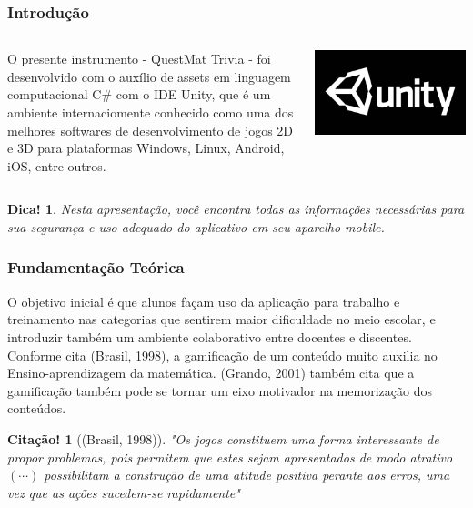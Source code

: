\documentclass[10pt]{beamer}
\newtheorem{hint}[theorem]{Dica!}
\newtheorem{refboi}[theorem]{Citação!}
\begin{document}
\begin{frame}
\frametitle{Introdução}
\begin{columns}

O presente instrumento - QuestMat Trivia - foi desenvolvido com o auxílio de assets em linguagem computacional C\# com o IDE Unity, que é um ambiente internaciomente conhecido como uma dos melhores softwares de desenvolvimento de jogos 2D e 3D para plataformas Windows, Linux, Android, iOS, entre outros.

	
	\includegraphics[width=\linewidth]{unity.jpg}
\end{columns}

\vspace{1cm}
\begin{hint}
Nesta apresentação, você encontra todas as informações necessárias
para sua segurança e uso adequado do aplicativo em seu aparelho mobile. 
\end{hint}

\end{frame}


\begin{frame}
\frametitle{Fundamentação Teórica}

O objetivo inicial é que alunos façam uso da aplicação para trabalho e treinamento nas categorias que sentirem maior dificuldade no meio escolar, e introduzir também um ambiente colaborativo entre docentes e discentes.
\pause 
Conforme cita (Brasil, 1998),  a gamificação de um conteúdo muito auxilia no Ensino-aprendizagem da matemática.
\pause (Grando, 2001) também cita que a gamificação também pode se tornar um eixo motivador na memorização dos conteúdos. \pause 

\begin{refboi}[(Brasil, 1998)]
	"Os jogos constituem uma forma interessante de propor problemas, pois permitem que estes sejam apresentados de modo atrativo $ (\cdots) $ possibilitam a construção de uma atitude positiva perante aos erros, uma vez que as ações sucedem-se rapidamente"
\end{refboi}

\end{frame}
\end{document}
